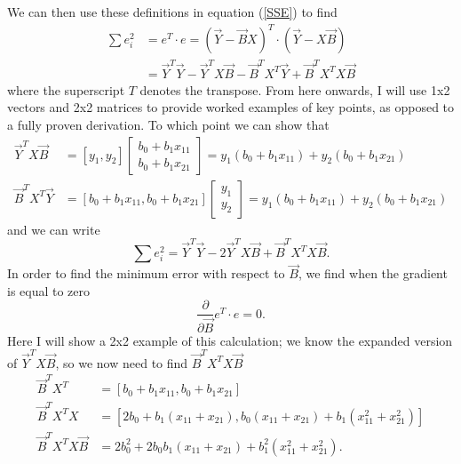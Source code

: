 \documentclass[12pt,a4paper]{report}
\begin{document}
		We can then use these definitions in equation (\ref{SSE}) to find
		\begin{align}
			\sum e_{i}^{2} &= e^{T}\cdot e = \left(\vec{Y} - \vec{B}X\right)^{T}\cdot \left(\vec{Y} - X\vec{B}\right)\\
			&= \vec{Y}^{T}\vec{Y} - \vec{Y}^{T}X\vec{B}- \vec{B}^{T}X^{T}\vec{Y} + \vec{B}^{T}X^{T}X\vec{B}
		\end{align}
		where the superscript $T$ denotes the transpose. From here onwards, I will use 1x2 vectors and 2x2 matrices to provide worked examples of key points, as opposed to a fully proven derivation. To which point we can show that 
		\begin{align}
			\vec{Y}^{T}X\vec{B} &= \left[y_{1}, y_{2}\right]
			\left[\begin{matrix}
					b_{0}+ b_{1}x_{11}\\
					b_{0}+b_{1}x_{21}
			\end{matrix}\right]
			= y_{1}\left(b_{0}+b_{1}x_{11}\right) + y_{2}\left(b_{0}+b_{1}x_{21}\right)\\
			\vec{B}^{T}X^{T}\vec{Y} &=\left[b_{0}+ b_{1}x_{11} , b_{0}+b_{1}x_{21}\right] 
			\left[\begin{matrix}
					y_{1}\\
					y_{2}
			\end{matrix}\right]
			= y_{1}\left(b_{0}+b_{1}x_{11}\right) + y_{2}\left(b_{0}+b_{1}x_{21}\right)
		\end{align}
		and we can write 
		\begin{equation}
			\sum e_{i}^{2} =\vec{Y}^{T}\vec{Y} - 2\vec{Y}^{T}X\vec{B}+ \vec{B}^{T}X^{T}X\vec{B}.
		\end{equation}
		In order to find the minimum error with respect to $\vec{B}$, we find when the gradient is equal to zero
		\begin{equation}
			\frac{\partial}{\partial\vec{B}} e^{T}\cdot e = 0.
			\label{minSSE}
		\end{equation}
		Here I will show a 2x2 example of this calculation; we know the expanded version of $\vec{Y}^{T}X\vec{B}$, so we now need to find $\vec{B}^{T}X^{T}X\vec{B}$
		\begin{align}
			\vec{B}^{T}X^{T} &=\left[b_{0}+ b_{1}x_{11} , b_{0}+b_{1}x_{21}\right]\\
			\vec{B}^{T}X^{T}X &=\left[2b_{0}+ b_{1}\left(x_{11}+x_{21}\right) , b_{0}\left(x_{11}+x_{21}\right) + b_{1}\left(x_{11}^{2}+x_{21}^{2}\right)\right]\\
			\vec{B}^{T}X^{T}X\vec{B} &= 2b_{0}^{2} + 2b_{0}b_{1}\left(x_{11}+x_{21}\right)+b_{1}^{2}\left(x_{11}^{2}+x_{21}^{2}\right).
		\end{align}
\end{document}
